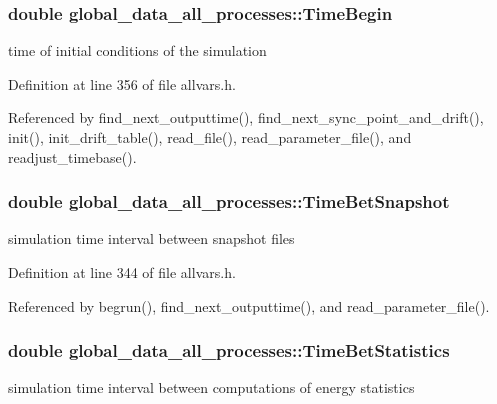 \hypertarget{structglobal__data__all__processes_ad671e0af15abea094631b996dc78c8f1}{
\subsubsection[{TimeBegin}]{\setlength{\rightskip}{0pt plus 5cm}double {\bf global\_\-data\_\-all\_\-processes::TimeBegin}}}
\label{structglobal__data__all__processes_ad671e0af15abea094631b996dc78c8f1}
time of initial conditions of the simulation 

Definition at line 356 of file allvars.h.



Referenced by find\_\-next\_\-outputtime(), find\_\-next\_\-sync\_\-point\_\-and\_\-drift(), init(), init\_\-drift\_\-table(), read\_\-file(), read\_\-parameter\_\-file(), and readjust\_\-timebase().

\hypertarget{structglobal__data__all__processes_a0c02c06bb5214dcf72dd4eb757df8ad3}{
\subsubsection[{TimeBetSnapshot}]{\setlength{\rightskip}{0pt plus 5cm}double {\bf global\_\-data\_\-all\_\-processes::TimeBetSnapshot}}}
\label{structglobal__data__all__processes_a0c02c06bb5214dcf72dd4eb757df8ad3}
simulation time interval between snapshot files 

Definition at line 344 of file allvars.h.



Referenced by begrun(), find\_\-next\_\-outputtime(), and read\_\-parameter\_\-file().

\hypertarget{structglobal__data__all__processes_a516be9ff5c4fd4171aa8e1a687e1e72d}{
\subsubsection[{TimeBetStatistics}]{\setlength{\rightskip}{0pt plus 5cm}double {\bf global\_\-data\_\-all\_\-processes::TimeBetStatistics}}}
\label{structglobal__data__all__processes_a516be9ff5c4fd4171aa8e1a687e1e72d}
simulation time interval between computations of energy statistics 

